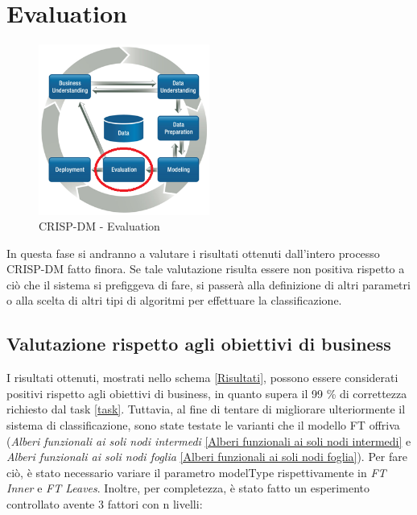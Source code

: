 \chapter{Evaluation}

\begin{figure}[hbtp]
	\centering
	\includegraphics[width=0.5\textwidth]{./images/CRISPDM_5.png}
	\caption{CRISP-DM - Evaluation}
	\label{CRISPDM_5}
\end{figure}
In questa fase si andranno a valutare i risultati ottenuti dall'intero processo CRISP-DM fatto finora. Se tale valutazione risulta essere non positiva rispetto a ciò che il sistema si prefiggeva di fare, si passerà alla definizione di altri parametri o alla scelta di altri tipi di algoritmi per effettuare la classificazione.

\section{Valutazione rispetto agli obiettivi di business}
I risultati ottenuti, mostrati nello schema \ref{Risultati}, possono essere considerati positivi rispetto agli obiettivi di business, in quanto supera il 99 \% di correttezza richiesto dal task \ref{task}. 
Tuttavia, al fine di tentare di migliorare ulteriormente il sistema di classificazione, sono state testate le varianti che il modello FT offriva (\emph{Alberi funzionali ai soli nodi intermedi} \ref{Alberi funzionali ai soli nodi intermedi} e \emph{Alberi funzionali ai soli nodi foglia} \ref{Alberi funzionali ai soli nodi foglia}). Per fare ciò, è stato necessario variare il parametro modelType rispettivamente in \emph{FT Inner} e \emph{FT Leaves}.
Inoltre, per completezza, è stato fatto un esperimento controllato avente 3 fattori con n livelli:

